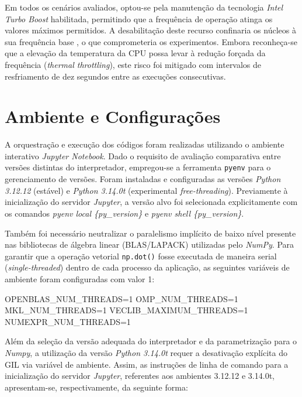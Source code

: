 \documentclass[acmsmall]{acmart}
\begin{document}
Em todos os cenários avaliados, optou-se pela manutenção da tecnologia \textit{Intel Turbo Boost} habilitada, permitindo que a frequência de operação atinga os valores máximos permitidos. A desabilitação deste recurso confinaria os núcleos à sua frequência base \cite{IntelTurbo}, o que comprometeria os experimentos. Embora reconheça-se que a elevação da temperatura da CPU possa levar à redução forçada da frequência (\textit{thermal throttling}), este risco foi mitigado com intervalos de resfriamento de dez segundos entre as execuções consecutivas.


\section{Ambiente e Configurações}

A orquestração e execução dos códigos foram realizadas utilizando o ambiente interativo \textit{Jupyter Notebook}. Dado o requisito de avaliação comparativa entre versões distintas do interpretador, empregou-se a ferramenta \texttt{pyenv} para o gerenciamento de versões. Foram instaladas e configuradas as versões \textit{Python 3.12.12} (estável) e \textit{Python 3.14.0t} (experimental \textit{free-threading}). Previamente à inicialização do servidor \textit{Jupyter}, a versão alvo foi selecionada explicitamente com os comandos \textit{pyenv local \{py\_version\}} e \textit{pyenv shell \{py\_version\}}.

Também foi necessário neutralizar o paralelismo implícito de baixo nível presente nas bibliotecas de álgebra linear (BLAS/LAPACK) utilizadas pelo \textit{NumPy}. Para garantir que a operação vetorial \texttt{np.dot()} fosse executada de maneira serial (\textit{single-threaded}) dentro de cada processo da aplicação, as seguintes variáveis de ambiente foram configuradas com valor 1:

\begin{flushleft}
	OPENBLAS\_NUM\_THREADS=1 \hspace{0.05cm} OMP\_NUM\_THREADS=1 \hspace{0.05cm} MKL\_NUM\_THREADS=1  
	VECLIB\_MAXIMUM\_THREADS=1 \hspace{0.05cm} NUMEXPR\_NUM\_THREADS=1 
\end{flushleft}

Além da seleção da versão adequada do interpretador e da parametrização para o \textit{Numpy}, a utilização da versão \textit{Python 3.14.0t} requer a desativação explícita do GIL via variável de ambiente. Assim, as instruções de linha de comando para a inicialização do servidor \textit{Jupyter}, referentes aos ambientes 3.12.12 e 3.14.0t, apresentam-se, respectivamente, da seguinte forma:
\end{document}
